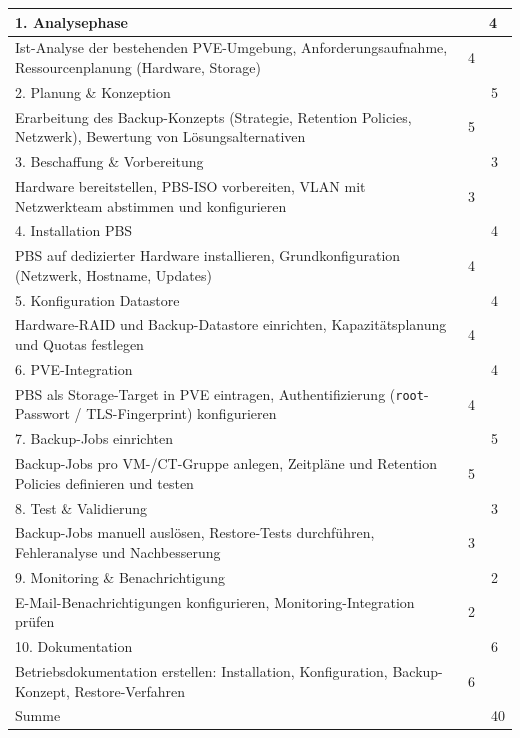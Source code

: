 \begin{tabularx}{\textwidth}{Xrr}
    \rowcolor{heading} 1. Analysephase & & 4\  \\ \hline
    Ist-Analyse der bestehenden \ac{PVE}-Umgebung, Anforderungsaufnahme, Ressourcenplanung (Hardware, Storage) & 4 & \\ \hline
    \rowcolor{heading} 2. Planung \& Konzeption & & 5\  \\ \hline
    Erarbeitung des Backup-Konzepts (Strategie, Retention Policies, Netzwerk), Bewertung von Lösungsalternativen & 5 & \\ \hline
    \rowcolor{heading} 3. Beschaffung \& Vorbereitung & & 3\  \\ \hline
    Hardware bereitstellen, \ac{PBS}-ISO vorbereiten, \ac{VLAN} mit Netzwerkteam abstimmen und konfigurieren & 3 & \\ \hline
    \rowcolor{heading} 4. Installation \ac{PBS} & & 4\  \\ \hline
    \ac{PBS} auf dedizierter Hardware installieren, Grundkonfiguration (Netzwerk, Hostname, Updates) & 4 & \\ \hline
    \rowcolor{heading} 5. Konfiguration Datastore & & 4\  \\ \hline
    Hardware-\ac{RAID} und Backup-Datastore einrichten, Kapazitätsplanung und Quotas festlegen & 4 & \\ \hline
    \rowcolor{heading} 6. \ac{PVE}-Integration & & 4\  \\ \hline
    \ac{PBS} als Storage-Target in \ac{PVE} eintragen, Authentifizierung (\texttt{root}-Passwort / TLS-Fingerprint) konfigurieren & 4 & \\ \hline
    \rowcolor{heading} 7. Backup-Jobs einrichten & & 5\  \\ \hline
    Backup-Jobs pro \ac{VM}-/\ac{CT}-Gruppe anlegen, Zeitpläne und Retention Policies definieren und testen & 5 & \\ \hline
    \rowcolor{heading} 8. Test \& Validierung & & 3\  \\ \hline
    Backup-Jobs manuell auslösen, Restore-Tests durchführen, Fehleranalyse und Nachbesserung & 3 & \\ \hline
    \rowcolor{heading} 9. Monitoring \& Benachrichtigung & & 2\  \\ \hline
    E-Mail-Benachrichtigungen konfigurieren, Monitoring-Integration prüfen & 2 & \\ \hline
    \rowcolor{heading} 10. Dokumentation & & 6\  \\ \hline
    Betriebsdokumentation erstellen: Installation, Konfiguration, Backup-Konzept, Restore-Verfahren & 6 & \\ \hline
    \rowcolor{heading} Summe & & 40 \\ \hline
\end{tabularx}
